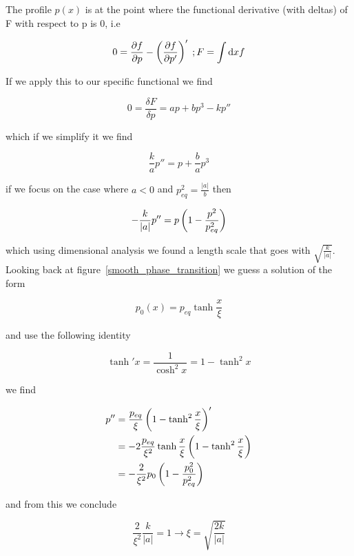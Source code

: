 The profile \(p(x)\) is at the point where the functional derivative  (with deltas) of F with respect to p is 0, i.e

\begin{equation}
	0=\diffp{f}{p}-\ins{\diffp{f}{p'}}' \; ; F=\int\dd xf
\end{equation}

If we apply this to our specific functional we find

\begin{equation}
	0 = \frac{\delta F}{\delta p} = ap+bp^3-kp''
\end{equation}

which if we simplify it we find

\begin{equation}
	\frac{k}{a}p''=p+\frac{b}{a}p^3
\end{equation}

if we focus on the case where \(a<0\) and \(p_{eq}^2=\frac{\lvert a \rvert}{b}\) then

\begin{equation}
	-\frac{k}{\lvert a \rvert}p'' = p\left(1-\frac{p^2}{p_{eq}^2}\right)
\end{equation}

which using dimensional analysis we found a length scale that goes with \(\sqrt{\frac{k}{\lvert a \rvert}}\). Looking back at figure~\ref{smooth_phase_transition} we guess a solution of the form

\begin{equation}
	p_0(x) = p_{eq}\tanh\frac{x}{\xi}
\end{equation}

and use the following identity

\begin{equation}
	\tanh'x=\frac{1}{\cosh^2x}=1-\tanh^2x
\end{equation}

we find

\begin{align}
	p'' &= \frac{p_{eq}}{\xi}\left(1-\tanh^2\frac{x}{\xi}\right)'\\
	&= -2\frac{p_{eq}}{\xi^2}\tanh\frac{x}{\xi}\left(1-\tanh^2\frac{x}{\xi}\right)\\
	&= -\frac{2}{\xi^2}p_0\left(1-\frac{p_0^2}{p_{eq}^2}\right)
\end{align}

and from this we conclude

\begin{equation}
	\frac{2}{\xi^2}\frac{k}{\lvert a \rvert}=1 \rightarrow \xi = \sqrt{\frac{2k}{\lvert a \rvert}}
\end{equation}

